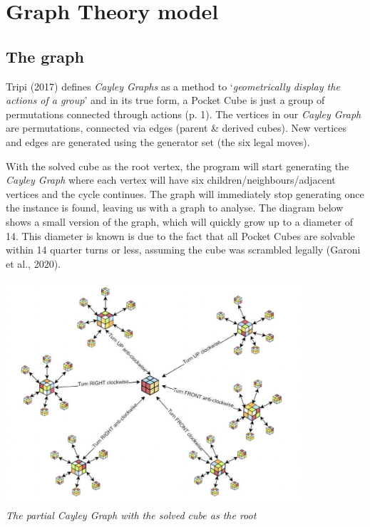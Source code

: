 \documentclass[a4paper]{article}
\begin{document}
\section{Graph Theory model}
\subsection{The graph}
\label{graph}

\par Tripi (2017) defines \emph{Cayley Graphs} as a method to ‘\emph{geometrically display the actions of a group}’ and in its true form, a Pocket Cube is just a group of permutations connected through actions (p. 1). The vertices in our \emph{Cayley Graph} are permutations, connected via edges (parent \& derived cubes). New vertices and edges are generated using the generator set (the six legal moves).

\par With the solved cube as the root vertex, the program will start generating the \emph{Cayley Graph} where each vertex will have six children/neighbours/adjacent vertices and the cycle continues. The graph will immediately stop generating once the instance is found, leaving us with a graph to analyse. The diagram below shows a small version of the graph, which will quickly grow up to a diameter of 14. This diameter is known is due to the fact that all Pocket Cubes are solvable within 14 quarter turns or less, assuming the cube was scrambled legally (Garoni et al., 2020).

\begin{center}
\includegraphics[width=11cm]{cayley.png}\\
\emph{The partial Cayley Graph with the solved cube as the root}
\end{center}
\end{document}
